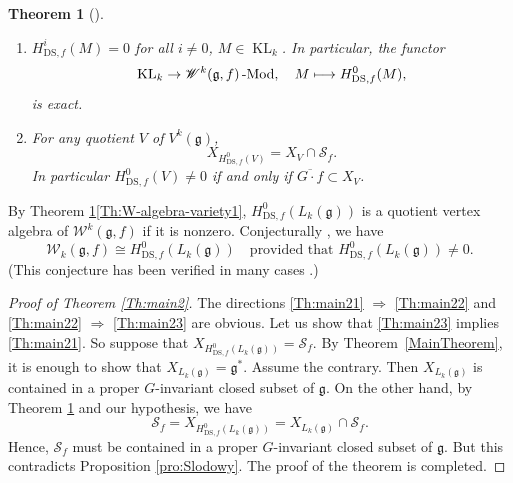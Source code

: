 \documentclass[11pt]{article}
\newcommand{\skpt}{\smallskip}
\numberwithin{equation}{section}
\newcommand\mto{\mathchoice{\longmapsto}{\mapsto}{\mapsto}{\mapsto}}
\newcommand{\DS}{\mathrm{DS}}
\let\on\operatorname
\newcommand \g{\mathfrak g}
\newcommand \W{\mathscr{W}}
\newtheorem{theorem}{Theorem}[section]
\theoremstyle{definition}
\begin{document}
\skpt
\begin{theorem}[{\cite{Ara09b}}]
\label{Th:W-algebra-variety}
\begin{enumerate}
\item\label{Th:W-algebra-variety1} $H_{\DS,f}^i(M)=0$ for all $i\ne 0$, $M\in
\on{KL}_k$.
In particular, the functor
\[
\on{KL}_k\to\W^k(\g,f)\on{-Mod},\quad M\mto
H_{\DS,f}^{0}(M),
\]
is exact.
\item\label{Th:W-algebra-variety2}
For any quotient $V$ of $V^k(\g)$,
\begin{equation*}
X_{H^{0}_{\DS,f}(V)}=X_{V}\cap \mathscr{S}_{f}.
\end{equation*}
In particular
$H_{\DS,f}^{0}(V)
\ne 0$ if and only if
$\overline{G\cdot f}\subset X_V$.
\label{item:intersection}
\end{enumerate}
\end{theorem}

By Theorem \ref{Th:W-algebra-variety}\eqref{Th:W-algebra-variety1},
$H^{0}_{\DS,f}(L_k(\g))$ is a quotient vertex algebra of $\W^k(\g,f)$ if it is nonzero.
Conjecturally \cite{KacRoaWak03,KacWak08},
we have
\begin{equation*}
\W_k(\g,f)\cong H^{0}_{\DS,f}(L_k(\g))\quad\text{provided that }H^{0}_{\DS,f}(L_k(\g))\ne 0.
\end{equation*}
(This conjecture has been verified in many cases \cite{Ara05,Ara07,Ara08-a,AEkeren19}.)

\begin{proof}[Proof of Theorem \ref{Th:main2}]
The directions \eqref{Th:main21} $\Rightarrow$ \eqref{Th:main22}
and \eqref{Th:main22} $\Rightarrow$ \eqref{Th:main23} are obvious.
Let us show that \eqref{Th:main23} implies \eqref{Th:main21}.
So suppose that $X_{H^{0}_{\DS,f}(L_k(\g))}=\mathscr{S}_f$.
By Theorem~\ref{MainTheorem}, it is enough to show that $X_{L_k(\g)}=\g^*$.
Assume the contrary. Then $X_{L_k(\g)}$ is contained in a proper
$G$-invariant closed subset of $\g$.
On the other hand, by Theorem \ref{Th:W-algebra-variety} and our hypothesis,
we have
\[
\mathscr{S}_f=X_{H^{0}_{\DS,f}(L_k(\g))}= X_{L_k(\g)} \cap \mathscr{S}_f.
\]
Hence, $ \mathscr{S}_f$ must be contained
in a proper
$G$-invariant closed subset of $\g$. But this contradicts Proposition \ref{pro:Slodowy}.
The proof of the theorem is completed.
\end{proof}


\end{document}
